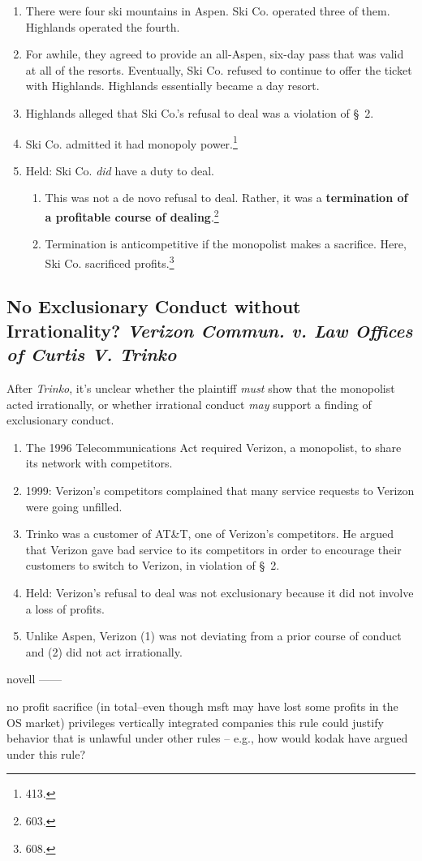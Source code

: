 \begin{enumerate}
    \item There were four ski mountains in Aspen. Ski Co. operated three of 
    them. Highlands operated the fourth.
    \item For awhile, they agreed to provide an all-Aspen, six-day pass that 
    was valid at all of the resorts. Eventually, Ski Co. refused to continue to 
    offer the ticket with Highlands. Highlands essentially became a day resort.
    \item Highlands alleged that Ski Co.'s refusal to deal was a violation of 
    \S\ 2.
    \item Ski Co. admitted it had monopoly power.\footnote{413.}
    \item Held: Ski Co. \emph{did} have a duty to deal.
    \begin{enumerate}
        \item This was not a de novo refusal to deal. Rather, it was a 
        \textbf{termination of a profitable course of dealing}.\footnote{603.}
        \item Termination is anticompetitive if the monopolist makes a 
        sacrifice. Here, Ski Co. sacrificed profits.\footnote{608.}
    \end{enumerate}
\end{enumerate}

\subsection{No Exclusionary Conduct without Irrationality? \emph{Verizon 
Commun. v. Law Offices of Curtis V. Trinko}}

After \emph{Trinko}, it's unclear whether the plaintiff \emph{must} show that 
the monopolist acted irrationally, or whether irrational conduct \emph{may} 
support a finding of exclusionary conduct.

\begin{enumerate}
    \item The 1996 Telecommunications Act required Verizon, a monopolist, to 
    share its network with competitors.
    \item 1999: Verizon's competitors complained that many service requests to 
    Verizon were going unfilled.
    \item Trinko was a customer of AT\&T, one of Verizon's competitors. He 
    argued that Verizon gave bad service to its competitors in order to 
    encourage their customers to switch to Verizon, in violation of \S\ 2.
    \item Held: Verizon's refusal to deal was not exclusionary because it did 
    not involve a loss of profits.
    \item Unlike Aspen, Verizon (1) was not deviating from a prior course of 
    conduct and (2) did not act irrationally.
\end{enumerate}

novell %
------

no profit sacrifice (in total--even though msft may have lost some profits in 
the OS market)
    privileges vertically integrated companies
    this rule could justify behavior that is unlawful under other rules -- 
    e.g., how would kodak have argued under this rule? 

